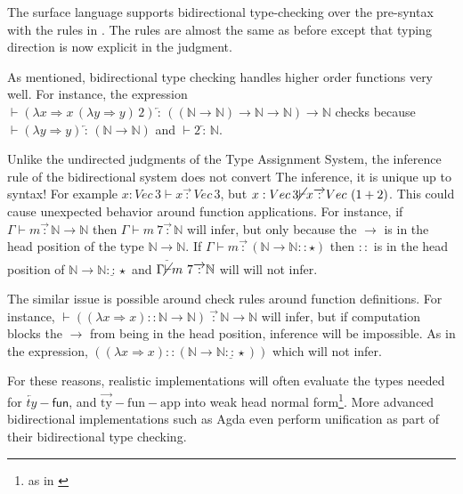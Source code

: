 The surface language supports bidirectional type-checking over the pre-syntax with the rules in .
The rules are almost the same as before except that typing direction is now explicit in the judgment.

As mentioned, bidirectional type checking handles higher order functions very well.
For instance, the expression $\vdash(\lambda x\Rightarrow x\,(\lambda y\Rightarrow y)\,2)\overleftarrow{\,:\,}\left(\left(\mathbb{N}\rightarrow\mathbb{N}\right)\rightarrow\mathbb{N}\rightarrow\mathbb{N}\right)\rightarrow\mathbb{N}$ checks because $\vdash(\lambda y\Rightarrow y)\overleftarrow{\,:\,}\left(\mathbb{N}\rightarrow\mathbb{N}\right)$ and $\vdash2\overleftarrow{\,:\,}\mathbb{N}$.

Unlike the undirected judgments of the Type Assignment System, the inference rule of the bidirectional system does not convert
The inference, it is unique up to syntax!
For example $x:Vec\,3\vdash x\overrightarrow{\,:\,}Vec\,3$, but $x:Vec\,3\cancel{\vdash}x\overrightarrow{\,:\,}Vec\,\left(1+2\right)$.
This could cause unexpected behavior around function applications.
For instance, if $\Gamma\vdash m\overrightarrow{\,:\,}\mathbb{N}\rightarrow\mathbb{N}$ then $\Gamma\vdash m\:7\overrightarrow{\,:\,}\mathbb{N}$ will infer, but only because the $\rightarrow$ is in the head position of the type $\mathbb{N}\underline{\rightarrow}\mathbb{N}$.
If $\Gamma\vdash m\overrightarrow{\,:\,}\left(\mathbb{N}\rightarrow\mathbb{N}::\star\right)$ then $::$ is in the head position of $\mathbb{N}\rightarrow\mathbb{N}\underline{::}\star$ and $\Gamma\cancel{\vdash}m\ 7\overrightarrow{\,:\,}\mathbb{N}$ will will not infer.

The similar issue is possible around check rules around function definitions.
For instance, $\vdash\left((\lambda x\Rightarrow x)::\mathbb{N}\rightarrow\mathbb{N}\right)\ \overrightarrow{\,:\,}\mathbb{N}\rightarrow\mathbb{N}$ will infer, but if computation blocks the $\rightarrow$ from being in the head position, inference will be impossible.
As in the expression, $\left((\lambda x\Rightarrow x)::\left(\mathbb{N}\rightarrow\mathbb{N}\underline{::}\star\right)\right)$ which will not infer.

For these reasons, realistic implementations will often evaluate the types needed for $\overleftarrow{ty}-\mathsf{fun}$, and $\operatorname{\overrightarrow{ty}-fun-app}$ into weak head normal form\footnote{as in \cite{COQUAND1996167}}.
More advanced bidirectional implementations such as Agda\cite{norell2007towards} even perform unification as part of their bidirectional type checking.

